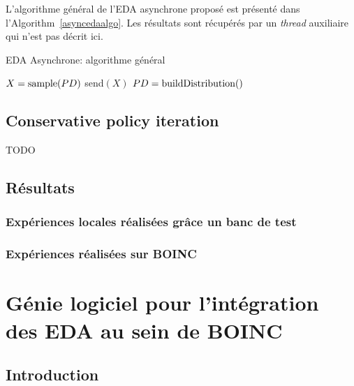 \documentclass[a4paper, 11pt]{report}
\begin{document}
L'algorithme général de l'EDA asynchrone proposé est présenté dans l'Algorithm~\ref{asyncedaalgo}. Les résultats sont récupérés par un \textit{thread} auxiliaire qui n'est pas décrit ici. 


\begin{algorithm}                      
\caption{EDA Asynchrone: algorithme général}          
\label{asyncedaalgo}                           
\begin{algorithmic}   
\STATE $X = \textnormal{sample}(PD)$
\STATE send$(X)$
\ENDIF
{}
\STATE $PD = \textnormal{buildDistribution}()$
\ENDIF
\ENDWHILE
             
\end{algorithmic}
\end{algorithm}

\section{Conservative policy iteration}
TODO

\section{Résultats}

\subsection{Expériences locales réalisées grâce un banc de test}

\subsection{Expériences réalisées sur \textsc{BOINC}}



\chapter{Génie logiciel pour l'intégration des EDA au sein de \textsc{BOINC}}

\section{Introduction}
\end{document}
